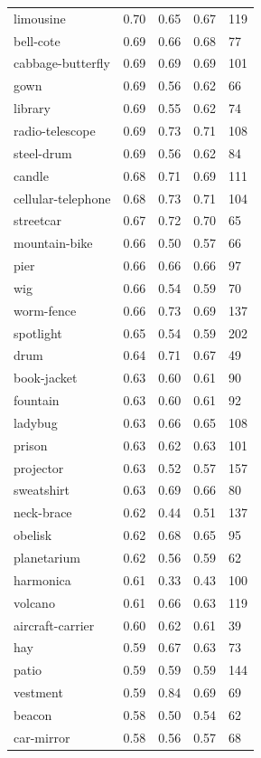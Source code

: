 \begin{center}
\begin{longtable}{lllll}
limousine & 0.70 & 0.65 & 0.67 & 119 \\
bell-cote & 0.69 & 0.66 & 0.68 & 77 \\
cabbage-butterfly & 0.69 & 0.69 & 0.69 & 101 \\
gown & 0.69 & 0.56 & 0.62 & 66 \\
library & 0.69 & 0.55 & 0.62 & 74 \\
radio-telescope & 0.69 & 0.73 & 0.71 & 108 \\
steel-drum & 0.69 & 0.56 & 0.62 & 84 \\
candle & 0.68 & 0.71 & 0.69 & 111 \\
cellular-telephone & 0.68 & 0.73 & 0.71 & 104 \\
streetcar & 0.67 & 0.72 & 0.70 & 65 \\
mountain-bike & 0.66 & 0.50 & 0.57 & 66 \\
pier & 0.66 & 0.66 & 0.66 & 97 \\
wig & 0.66 & 0.54 & 0.59 & 70 \\
worm-fence & 0.66 & 0.73 & 0.69 & 137 \\
spotlight & 0.65 & 0.54 & 0.59 & 202 \\
drum & 0.64 & 0.71 & 0.67 & 49 \\
book-jacket & 0.63 & 0.60 & 0.61 & 90 \\
fountain & 0.63 & 0.60 & 0.61 & 92 \\
ladybug & 0.63 & 0.66 & 0.65 & 108 \\
prison & 0.63 & 0.62 & 0.63 & 101 \\
projector & 0.63 & 0.52 & 0.57 & 157 \\
sweatshirt & 0.63 & 0.69 & 0.66 & 80 \\
neck-brace & 0.62 & 0.44 & 0.51 & 137 \\
obelisk & 0.62 & 0.68 & 0.65 & 95 \\
planetarium & 0.62 & 0.56 & 0.59 & 62 \\
harmonica & 0.61 & 0.33 & 0.43 & 100 \\
volcano & 0.61 & 0.66 & 0.63 & 119 \\
aircraft-carrier & 0.60 & 0.62 & 0.61 & 39 \\
hay & 0.59 & 0.67 & 0.63 & 73 \\
patio & 0.59 & 0.59 & 0.59 & 144 \\
vestment & 0.59 & 0.84 & 0.69 & 69 \\
beacon & 0.58 & 0.50 & 0.54 & 62 \\
car-mirror & 0.58 & 0.56 & 0.57 & 68 \\

\end{longtable}
\end{center}
